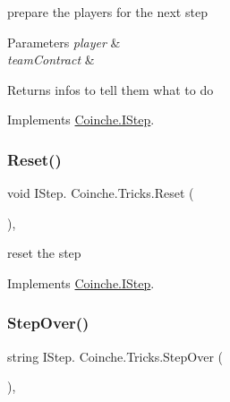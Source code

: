 prepare the players for the next step 


\begin{DoxyParams}{Parameters}
{\em player} & \\
\hline
{\em team\+Contract} & \\
\hline
\end{DoxyParams}
\begin{DoxyReturn}{Returns}
infos to tell them what to do
\end{DoxyReturn}


Implements \hyperlink{interface_coinche_1_1_i_step_ada17a0e471c5afbc7e4f4acc434cdd76}{Coinche.\+I\+Step}.

\mbox{\label{class_coinche_1_1_tricks_ade6668950abaf544373d90516821eab1}} 
\subsubsection{\texorpdfstring{Reset()}{Reset()}}
{\footnotesize\ttfamily void I\+Step. Coinche.\+Tricks.\+Reset (\begin{DoxyParamCaption}{ }\end{DoxyParamCaption})\hspace{0.3cm}{\ttfamily [inline]}, {\ttfamily [private]}}



reset the step 



Implements \hyperlink{interface_coinche_1_1_i_step_a764f20494a35e9b006c6495a38717e9a}{Coinche.\+I\+Step}.

\mbox{\label{class_coinche_1_1_tricks_afa44486bcd0e3ce034330d8c0f0d36eb}} 
\subsubsection{\texorpdfstring{Step\+Over()}{StepOver()}}
{\footnotesize\ttfamily string I\+Step. Coinche.\+Tricks.\+Step\+Over (\begin{DoxyParamCaption}{ }\end{DoxyParamCaption})\hspace{0.3cm}{\ttfamily [inline]}, {\ttfamily [private]}}



